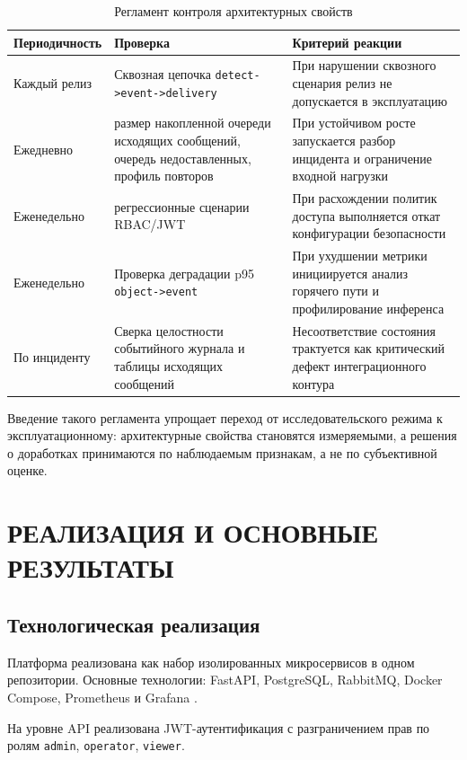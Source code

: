 \begin{table}[H]
\caption{Регламент контроля архитектурных свойств}
\label{tab:short_arch_regulation}
\begin{tabularx}{\textwidth}{>{\raggedright\arraybackslash}p{}p{}X}
\toprule
Периодичность & Проверка & Критерий реакции \\
\midrule
Каждый релиз & Сквозная цепочка \texttt{detect->event->delivery} & При нарушении сквозного сценария релиз не допускается в эксплуатацию \\
Ежедневно & размер накопленной очереди исходящих сообщений, очередь недоставленных, профиль повторов & При устойчивом росте запускается разбор инцидента и ограничение входной нагрузки \\
Еженедельно & регрессионные сценарии RBAC/JWT & При расхождении политик доступа выполняется откат конфигурации безопасности \\
Еженедельно & Проверка деградации p95 \texttt{object->event} & При ухудшении метрики инициируется анализ горячего пути и профилирование инференса \\
По инциденту & Сверка целостности событийного журнала и таблицы исходящих сообщений & Несоответствие состояния трактуется как критический дефект интеграционного контура \\
\bottomrule
\end{tabularx}
\end{table}

Введение такого регламента упрощает переход от исследовательского режима к эксплуатационному: архитектурные свойства становятся измеряемыми, а решения о доработках принимаются по наблюдаемым признакам, а не по субъективной оценке.

\chapter{РЕАЛИЗАЦИЯ И ОСНОВНЫЕ РЕЗУЛЬТАТЫ}
\label{ch:short_results}

\section{Технологическая реализация}

Платформа реализована как набор изолированных микросервисов в одном репозитории. Основные технологии: FastAPI, PostgreSQL, RabbitMQ, Docker Compose, Prometheus и Grafana \cite{fastapi_docs,postgresql_docs,rabbitmq_docs,docker_docs,prometheus_docs,grafana_docs}.

На уровне API реализована JWT-аутентификация с разграничением прав по ролям \texttt{admin}, \texttt{operator}, \texttt{viewer}.

